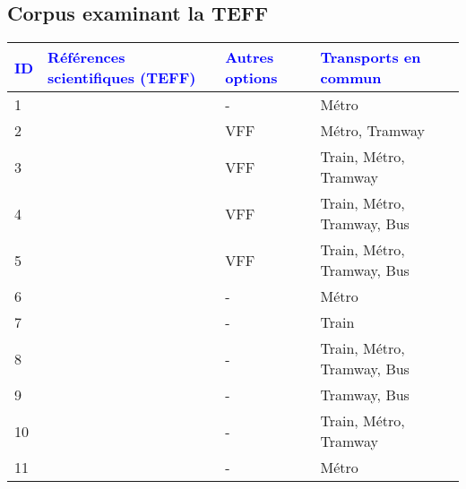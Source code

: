     \newpage
\subsection{Corpus examinant la \acrfull{TEFF}} \label{Corpus examinant la trottinette électrique en free-floating}
    \label{donnees-ouvertes:rsl_publications_teff}

        \begin{longtable}{p{0.5cm}p{5.5cm}p{3cm}p{4cm}}
        \hline
        \small{\textcolor{blue}{\textbf{ID}}} & \small{\textcolor{blue}{\textbf{Références scientifiques (TEFF)}}} & \small{\textcolor{blue}{\textbf{Autres options}}} & \small{\textcolor{blue}{\textbf{Transports en commun}}}\\
        \hline
        \endhead
    \small{1} & \small{\textcite{baek_electric_2021}}\index{Baek, Kwangho|pagebf} & \small{-} & \small{Métro}\\
    \small{2} & \small{\textcite{beale_integrating_2023}}\index{Beale, Kirsten|pagebf} & \small{VFF} & \small{Métro, Tramway}\\
    \small{3} & \small{\textcite{cervero_transit_2020}}\index{Cervero, Robert|pagebf} & \small{VFF} & \small{Train, Métro, Tramway}\\
    \small{4} & \small{\textcite{grosshuesch_solving_2020}}\index{Grosshuesch, Kelly|pagebf} & \small{VFF} & \small{Train, Métro, Tramway, Bus}\\
    \small{5} & \small{\textcite{park_first-last-mile_2021}}\index{Park, Keunhyun|pagebf} & \small{VFF} & \small{Train, Métro, Tramway, Bus}\\
    \small{6} & \small{\textcite{cao_e-scooter_2021}}\index{Cao, Zhejing|pagebf} & \small{-} & \small{Métro}\\
    \small{7} & \small{\textcite{tyndall_complementarity_2022}}\index{Tyndall, Justin|pagebf} & \small{-} & \small{Train}\\
    \small{8} & \small{\textcite{fearnley_delte_2020}}\index{Fearnley, Nils|pagebf} & \small{-} & \small{Train, Métro, Tramway, Bus}\\
    \small{9} & \small{\textcite{ganesh_multi-modal_2020}}\index{Ganesh, Aditya|pagebf} & \small{-} & \small{Tramway, Bus}\\
    \small{10} & \small{\textcite{heumann_spatiotemporal_2021}}\index{Heumann, Maximilian|pagebf} & \small{-} & \small{Train, Métro, Tramway}\\
    \small{11} & \small{\textcite{lee_forecasting_2021}}\index{Lee, Mina|pagebf} & \small{-} & \small{Métro}\\

\end{longtable}
